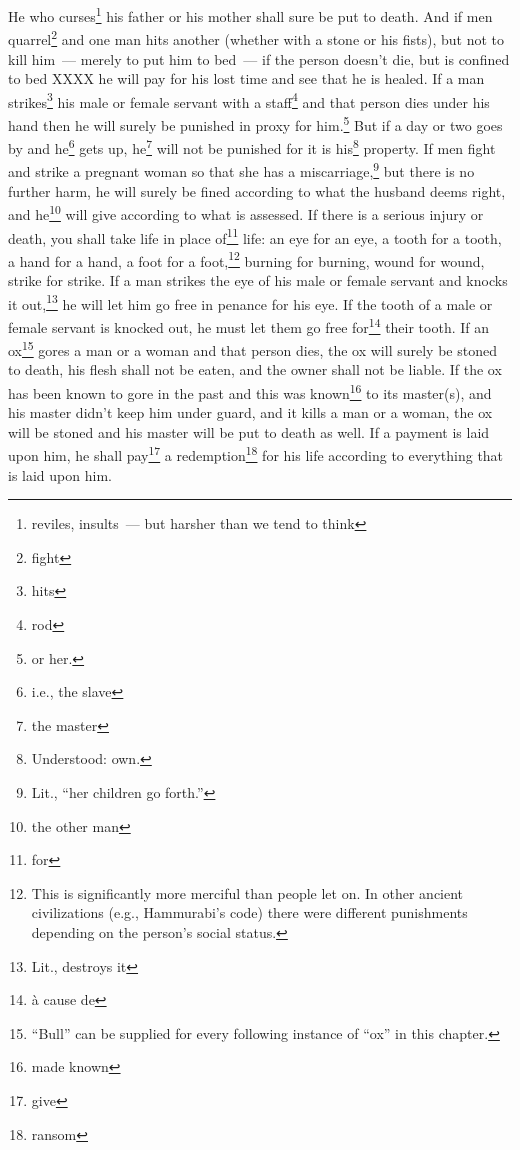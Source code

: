 \begin{enumerate}[align=center]
     He who curses\footnote{reviles, insults~--- but harsher than we tend to think} his father or his mother shall sure be put to death.%
     And if men quarrel\footnote{fight} and one man hits another (whether with a stone or his fists), but not to kill him~--- merely to put him to bed~---%
     if the person doesn't die, but is confined to bed XXXX he will pay for his lost time and see that he is healed.%
     If a man strikes\footnote{hits} his male or female servant with a staff\footnote{rod} and that person dies under his hand then he will surely be punished in proxy for him.\footnote{or her.}%
     But if a day or two goes by and he\footnote{i.e., the slave} gets up, he\footnote{the master} will not be punished for it is his\footnote{Understood: own.} property.%
     If men fight and strike a pregnant woman so that she has a miscarriage,\footnote{Lit., ``her children go forth.''} but there is no further harm, he will surely be fined according to what the husband deems right, and he\footnote{the other man} will give according to what is assessed.%
     If there is a serious injury or death, you shall take life in place of\footnote{for} life:%
     an eye for an eye, a tooth for a tooth, a hand for a hand, a foot for a foot,\footnote{This is significantly more merciful than people let on. In other ancient civilizations (e.g., Hammurabi's code) there were different punishments depending on the person's social status.}%
     burning for burning, wound for wound, strike for strike.%
     If a man strikes the eye of his male or female servant and knocks it out,\footnote{Lit., destroys it} he will let him go free in penance for his eye.%
     If the tooth of a male or female servant is knocked out, he must let them go free for\footnote{\`a cause de} their tooth.%
     If an ox\footnote{``Bull'' can be supplied for every following instance of ``ox'' in this chapter.} gores a man or a woman and that person dies, the ox will surely be stoned to death, his flesh shall not be eaten, and the owner shall not be liable.%
     If the ox has been known to gore in the past and this was known\footnote{made known} to its master(s), and his master didn't keep him under guard, and it kills a man or a woman, the ox will be stoned and his master will be put to death as well.%
     If a payment is laid upon him, he shall pay\footnote{give} a redemption\footnote{ransom} for his life according to everything that is laid upon him.%

\end{enumerate}
